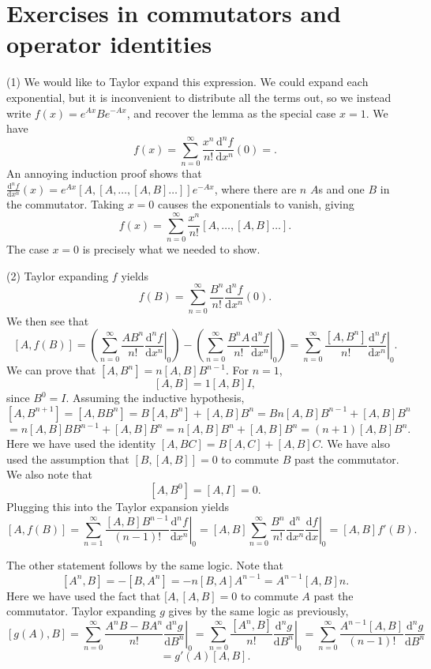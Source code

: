 \documentclass[11pt, letterpaper]{article}
\begin{document}
\section{Exercises in commutators and operator identities}

(1) We would like to Taylor expand this expression. We could expand each exponential, but it is inconvenient to distribute all the terms out, so we instead write $f(x)=e^{Ax} Be^{-Ax} $, and recover the lemma as the special case $x=1$. We have
\[
	f(x)=\sum_{n=0}^{\infty} \frac{x^n}{n!} \frac{\mathrm{d}^nf}{\mathrm{d}x^n} (0)=
.\]
An annoying induction proof shows that $\frac{\mathrm{d}^nf}{\mathrm{d}x^n}(x) =e^{Ax} [A,[A, \ldots ,[A,B]\ldots ]]e^{-Ax} $, where there are $n$ $A$s and one $B$ in the commutator. Taking $x=0$ causes the exponentials to vanish, giving
\[
	f(x)=\sum_{n=0}^{\infty} \frac{x^n}{n!} \left[ A, \ldots ,[A,B] \ldots  \right] 
.\]
The case $x=0$ is precisely what we needed to show.

(2) Taylor expanding $f$ yields
\[
	f(B)=\sum_{n=0}^{\infty} \frac{B^n}{n!} \frac{\mathrm{d}^nf}{\mathrm{d}x^n} (0)
.\]
We then see that
\[
	\left[ A,f(B) \right] =\left( \sum_{n=0}^{\infty} \frac{AB^n}{n!} \left.\frac{\mathrm{d}^nf}{\mathrm{d}x^n} \right|_0 \right) -\left( \sum_{n=0}^{\infty} \frac{B^nA}{n!} \left. \frac{\mathrm{d}^nf}{\mathrm{d}x^n} \right|_0 \right) =\sum_{n=0}^{\infty} \frac{\left[ A,B^n \right] }{n!} \left. \frac{\mathrm{d}^nf}{\mathrm{d}x^n} \right|_0
.\]
We can prove that $\left[ A,B^n \right] =n\left[ A,B  \right] B^{n-1}$. For $n=1$,
\[
	\left[ A,B \right] =1\left[ A,B \right] I,
\]
since $B^0=I$. Assuming the inductive hypothesis,
\[
	\left[ A,B^{n+1} \right] =\left[ A,BB^{n}  \right] =B\left[ A,B^n \right] +\left[ A,B \right] B^n=Bn\left[ A,B \right] B^{n-1} +\left[ A,B \right] B^n
\]
\[
	=n\left[ A,B \right] BB^{n-1} +\left[ A,B \right] B^n=n\left[ A,B \right] B^n+\left[ A,B \right] B^n=(n+1)\left[ A,B \right] B^n
.\]
Here we have used the identity $\left[ A,BC \right] =B[A,C]+[A,B]C$. We have also used the assumption that $[B,[A,B]]=0$ to commute $B$ past the commutator. We also note that
\[
	[A,B^0]=[A,I]=0
.\]
Plugging this into the Taylor expansion yields
\[
	\left[ A,f(B) \right] =\sum_{n=1}^{\infty} \frac{[A,B]B^{n-1} }{(n-1)!} \left.\frac{\mathrm{d}^nf}{\mathrm{d}x^n} \right|_0=\left[ A,B \right] \sum_{n=0}^{\infty} \frac{B^n}{n!} \left.\frac{\mathrm{d}^n}{\mathrm{d}x^n} \frac{\mathrm{d}f}{\mathrm{d}x} \right|_0=[A,B]f'(B)
.\]

The other statement follows by the same logic. Note that
\[
	[A^n,B]=-[B,A^n]=-n[B,A]A^{n-1} =A^{n-1} [A,B]n
.\]
Here we have used the fact that $[A,[A,B]=0$ to commute $A$ past the commutator. Taylor expanding $g$ gives by the same logic as previously,
\[
	\left[ g(A),B \right] =\sum_{n=0}^{\infty} \frac{A^nB-BA^n}{n!} \left. \frac{\mathrm{d}^ng}{\mathrm{d}B^n} \right|_0=\sum_{n=0}^{\infty} \frac{[A^n,B]}{n!} \left. \frac{\mathrm{d}^ng}{\mathrm{d}B^n} \right|_0=\sum_{n=0}^{\infty} \frac{A^{n-1}[A,B] }{(n-1)!} \frac{\mathrm{d}^ng}{\mathrm{d}B^n} 
\]
\[
	=g'(A)[A,B]
.\]
\end{document}

